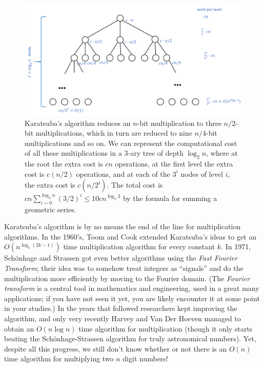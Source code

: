 \begin{figure}
\centering
\includegraphics[width=\textwidth, height=0.25\paperheight, keepaspectratio]{../figure/karatsuba_analysis2.png}
\caption{Karatsuba's algorithm reduces an \(n\)-bit multiplication to
three \(n/2\)-bit multiplications, which in turn are reduced to nine
\(n/4\)-bit multiplications and so on. We can represent the
computational cost of all these multiplications in a \(3\)-ary tree of
depth \(\log_2 n\), where at the root the extra cost is \(cn\)
operations, at the first level the extra cost is \(c(n/2)\) operations,
and at each of the \(3^i\) nodes of level \(i\), the extra cost is
\(c(n/2^i)\). The total cost is
\(cn\sum_{i=0}^{\log_2 n} (3/2)^i \leq 10cn^{\log_2 3}\) by the formula
for summing a geometric series.}
\label{karatsuba-fig}
\end{figure}

Karatsuba's algorithm is by no means the end of the line for
multiplication algorithms. In the 1960's, Toom and Cook extended
Karatsuba's ideas to get an \(O(n^{\log_k (2k-1)})\) time multiplication
algorithm for every constant \(k\). In 1971, Schönhage and Strassen got
even better algorithms using the \emph{Fast Fourier Transform}; their
idea was to somehow treat integers as ``signals'' and do the
multiplication more efficiently by moving to the Fourier domain. (The
\emph{Fourier transform} is a central tool in mathematics and
engineering, used in a great many applications; if you have not seen it
yet, you are likely encounter it at some point in your studies.) In the
years that followed researchers kept improving the algorithm, and only
very recently Harvey and Van Der Hoeven managed to obtain an
\(O(n \log n)\) time algorithm for multiplication (though it only starts
beating the Schönhage-Strassen algorithm for truly astronomical
numbers). Yet, despite all this progress, we still don't know whether or
not there is an \(O(n)\) time algorithm for multiplying two \(n\) digit
numbers!

